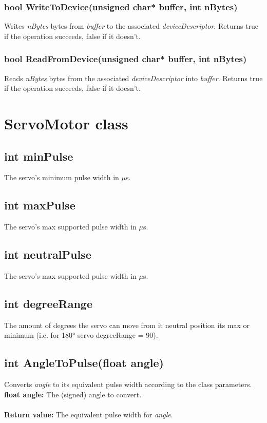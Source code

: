 \documentclass[letterpaper]{book}
\begin{document}
\subsubsection{bool WriteToDevice(unsigned char* buffer, int nBytes)}
Writes \textit{nBytes} bytes from \textit{buffer} to the associated \textit{deviceDescriptor}. Returns true if the operation succeeds, false if it doesn't.

\subsubsection{bool ReadFromDevice(unsigned char* buffer, int nBytes)}
Reads \textit{nBytes} bytes from the associated \textit{deviceDescriptor} into \textit{buffer}. Returns true if the operation succeeds, false if it doesn't.

	

\section{ServoMotor class}
\label{sec:ServoMotor}
\subsection{int minPulse}
The servo's minimum pulse width in $\mu$s.
\subsection{int maxPulse}
The servo's max supported pulse width in $\mu$s.
\subsection{int neutralPulse}
The servo's max supported pulse width in $\mu$s.
\subsection{int degreeRange}
The amount of degrees the servo can move from it neutral position its max or minimum (i.e. for 180° servo degreeRange = 90).

\subsection{int AngleToPulse(float angle)}
Converts \textit{angle} to its equivalent pulse width according to the class parameters.\\
\textbf{float angle: }The (signed) angle to convert.\\\\
\textbf{Return value: }The equivalent pulse width for \textit{angle}.
\end{document}
